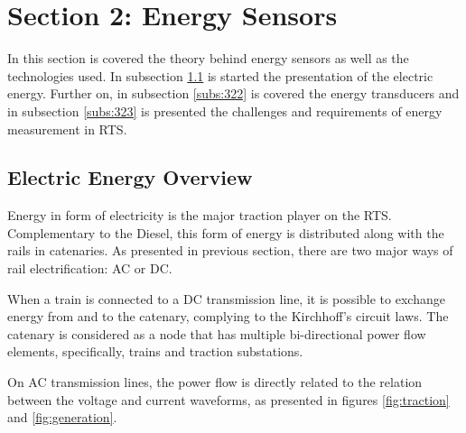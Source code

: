 


\section{Section 2: Energy Sensors}


In this section is covered the theory behind energy sensors as well as the technologies used. In subsection \ref{subs:321} is started the presentation of the electric energy. Further on, in subsection \ref{subs:322} is covered the energy transducers and in subsection \ref{subs:323} is presented the challenges and requirements of energy measurement in RTS. 

\subsection{Electric Energy Overview}
\label{subs:321}
Energy in form of electricity is the major traction player on the RTS. 
Complementary to the Diesel, this form of energy is distributed along with the rails in catenaries.
As presented in previous section, there are two major ways of rail electrification: AC or DC.

When a train is connected to a DC transmission line, it is possible to exchange energy from and to the catenary, complying to the Kirchhoff's circuit laws. The catenary is considered as a node that has multiple bi-directional power flow elements, specifically, trains and traction substations.

On AC transmission lines, the power flow is directly related to the relation between the voltage and current waveforms, as presented in figures \ref{fig:traction} and \ref{fig:generation}.

